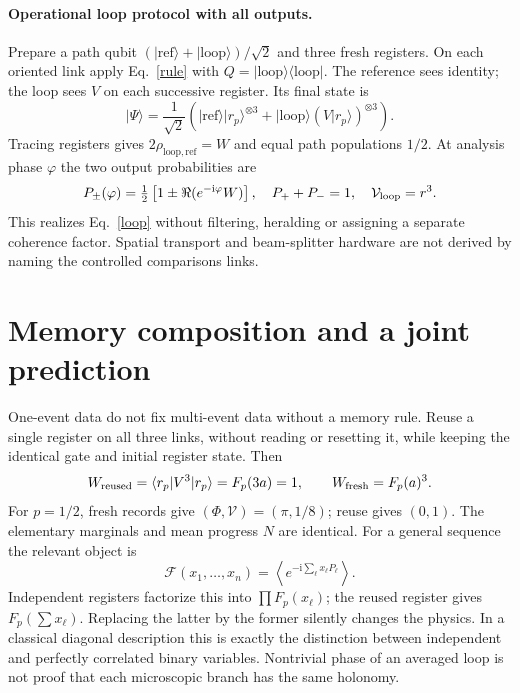 \documentclass[11pt,a4paper]{article}
\newcommand{\ii}{\mathrm i}
\newcommand{\ket}[1]{|#1\rangle}
\newcommand{\bra}[1]{\langle#1|}
\begin{document}
\paragraph{Operational loop protocol with all outputs.}
Prepare a path qubit $(\ket{\mathrm{ref}}+\ket{\mathrm{loop}})/\sqrt2$
and three fresh registers. On each oriented link apply Eq.~\eqref{rule}
with $Q=\ket{\mathrm{loop}}\bra{\mathrm{loop}}$. The reference sees
identity; the loop sees $V$ on each successive register. Its final state is
\begin{equation}
 \ket\Psi=\frac{1}{\sqrt2}\left(
 \ket{\mathrm{ref}}\ket{r_p}^{\otimes3}
 +\ket{\mathrm{loop}}(V\ket{r_p})^{\otimes3}\right).
\end{equation}
Tracing registers gives $2\rho_{\mathrm{loop,ref}}=W$ and equal
path populations $1/2$. At analysis phase $\varphi$ the two output
probabilities are
\begin{equation}
 P_\pm(\varphi)=\tfrac12\left[1\pm
       \Re(e^{-\ii\varphi}W)\right],\quad
 P_++P_-=1,\quad \mathcal V_{\rm loop}=r^3.\label{fringe}
\end{equation}
This realizes Eq.~\eqref{loop} without filtering, heralding or assigning
a separate coherence factor. Spatial transport and beam-splitter
hardware are not derived by naming the controlled comparisons links.

\newpage
\section{Memory composition and a joint prediction}
One-event data do not fix multi-event data without a memory rule.
Reuse a single register on all three links, without reading or resetting
it, while keeping the identical gate and initial register state. Then
\begin{equation}
 W_{\rm reused}=\langle r_p|V^3|r_p\rangle=F_p(3a)=1,
 \qquad W_{\rm fresh}=F_p(a)^3.\label{memory}
\end{equation}
For $p=1/2$, fresh records give $(\Phi,\mathcal V)=(\pi,1/8)$;
reuse gives $(0,1)$. The elementary marginals and mean progress $N$
are identical. For a general sequence the relevant object is
\begin{equation}
 \mathcal F(x_1,\ldots,x_n)=
 \left\langle e^{-\ii\sum_\ell x_\ell P_\ell}\right\rangle.
\end{equation}
Independent registers factorize this into $\prod F_p(x_\ell)$;
the reused register gives $F_p(\sum x_\ell)$. Replacing the latter
by the former silently changes the physics. In a classical diagonal
description this is exactly the distinction between independent and
perfectly correlated binary variables. Nontrivial phase of an averaged
loop is not proof that each microscopic branch has the same holonomy.
\end{document}
